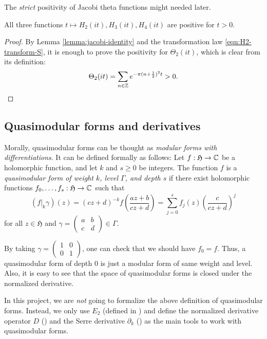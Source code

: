 The \emph{strict} positivity of Jacobi theta functions might needed later.
\begin{corollary}\label{cor:theta-pos}
All three functions $t \mapsto H_2(it), H_3(it), H_4(it)$ are positive for $t > 0$.
\end{corollary}
\begin{proof}
By Lemma \ref{lemma:jacobi-identity} and the transformation law \eqref{eqn:H2-transform-S}, it is enough to prove the positivity for $\Theta_2(it)$, which is clear from its definition:
\begin{equation}
    \Theta_{2}(it) = \sum_{n \in \mathbb{Z}} e^{- \pi (n + \frac{1}{2})^{2} t} > 0.
\end{equation}
\end{proof}

\subsection{Quasimodular forms and derivatives}

Morally, quasimodular forms can be thought as \emph{modular forms with differentiations}.
It can be defined formally as follows:
Let $f: \mathfrak{H} \to \mathbb{C}$ be a holomorphic function, and let $k$ and $s \ge 0$ be integers.
The function $f$ is a \emph{quasimodular form of weight $k$, level $\Gamma$, and depth $s$} if there exist holomorphic functions $f_0, \dots, f_s : \mathfrak{H} \to \mathbb{C}$ such that
\begin{equation}\label{eqn:quasimod-def}
    (f|_{k}\gamma)(z) = (cz + d)^{-k} f\left(\frac{az + b}{cz + d}\right) = \sum_{j=0}^{s} f_j(z) \left(\frac{c}{cz + d}\right)^j
\end{equation}
for all $z \in \mathfrak{H}$ and $\gamma = \left(\begin{smallmatrix} a&b\\c&d \end{smallmatrix}\right) \in \Gamma$.

By taking $\gamma = \left(\begin{smallmatrix} 1 & 0 \\ 0 & 1 \end{smallmatrix}\right)$, one can check that we should have $f_0 = f$. Thus, a quasimodular form of depth $0$ is just a modular form of same weight and level.
Also, it is easy to see that the space of quasimodular forms is closed under the normalized derivative.

In this project, we are \emph{not} going to formalize the above definition of quasimodular forms.
Instead, we only use $E_2$ (defined in ) and define the normalized derivative operator $D$ () and the Serre derivative $\partial_k$ () as the main tools to work with quasimodular forms.

